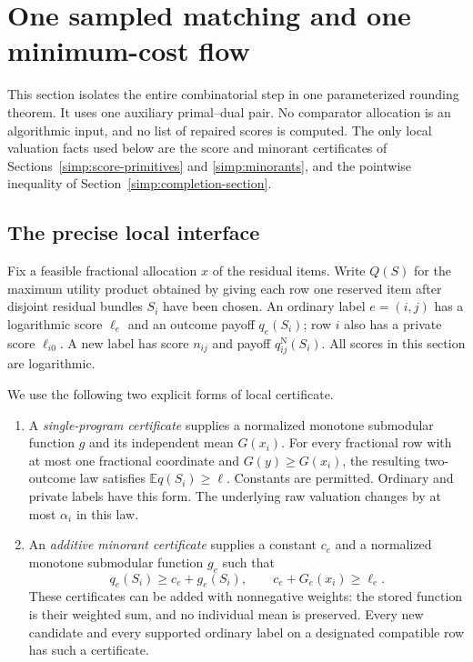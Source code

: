 \section{One sampled matching and one minimum-cost flow}
\label{simp:graph}

This section isolates the entire combinatorial step in one parameterized
rounding theorem.  It uses one auxiliary primal--dual pair.  No comparator
allocation is an algorithmic input, and no list of repaired scores is
computed.  The only local valuation facts used below are the score and
minorant certificates of Sections~\ref{simp:score-primitives} and
\ref{simp:minorants}, and the pointwise inequality of
Section~\ref{simp:completion-section}.

\subsection{The precise local interface}

Fix a feasible fractional allocation $x$ of the residual items.
Write $Q(S)$ for the maximum utility product obtained by giving each row
one reserved item after disjoint residual bundles $S_i$ have been chosen.
An ordinary label $e=(i,j)$ has a logarithmic score $\ell_e$ and an
outcome payoff $q_e(S_i)$; row $i$ also has a private score $\ell_{i0}$.
A new label has score $n_{ij}$ and payoff $q^{\mathrm N}_{ij}(S_i)$.
All scores in this section are logarithmic.

We use the following two explicit forms of local certificate.

\begin{enumerate}
\item A \emph{single-program certificate} supplies a normalized monotone
submodular function $g$ and its independent mean $G(x_i)$.  For every
fractional row with at most one fractional coordinate and $G(y)\ge G(x_i)$,
the resulting two-outcome law satisfies $\mathbb E q(S_i)\ge\ell$.
Constants are permitted.  Ordinary and private labels have this form.
The underlying raw valuation changes by at most $\alpha_i$ in this law.
\item An \emph{additive minorant certificate} supplies a constant $c_e$
and a normalized monotone submodular function $g_e$ such that
\[
 q_e(S_i)\ge c_e+g_e(S_i),\qquad
 c_e+G_e(x_i)\ge\ell_e.
\]
These certificates can be added with nonnegative weights: the stored
function is their weighted sum, and no individual mean is preserved.
Every new candidate and every supported ordinary label on a designated
compatible row has such a certificate.
\end{enumerate}

